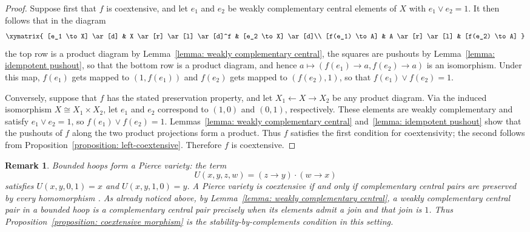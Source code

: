 \documentclass[11pt]{article}
\theoremstyle{pretty}
\theoremstyle{plainnote}
\newtheorem{remark}[theorem]{Remark}
\renewcommand{\2}{\mathbf{2}}
\begin{document}
\begin{proof}
Suppose first that $f$ is coextensive, and let $e_1$ and $e_2$ be weakly complementary central elements of $X$ with $e_1 \vee e_2 = 1$. It then follows that in the diagram
\[
\xymatrix{
[e_1 \to X] \ar[d] & X \ar[r] \ar[l] \ar[d]^f & [e_2 \to X] \ar[d]\\ 
[f(e_1) \to A] & A \ar[r] \ar[l] & [f(e_2) \to A]
}
\]
the top row is a product diagram by Lemma~\ref{lemma: weakly complementary central}, the squares are pushouts by Lemma~\ref{lemma: idempotent pushout}, so that the bottom row is a product diagram, and hence $a \mapsto (f(e_1) \to a, f(e_2) \to a)$ is an isomorphism. Under this map, $f(e_1)$ gets mapped to $(1, f(e_1))$ and $f(e_2)$ gets mapped to $(f(e_2), 1)$, so that $f(e_1) \vee f(e_2) = 1$. 

Conversely, suppose that $f$ has the stated preservation property, and let $X_1\leftarrow X\to X_2$ be any product diagram. Via the induced isomorphism $X\cong X_1\times X_2$, let $e_1$ and $e_2$ correspond to $(1,0)$ and $(0,1)$, respectively. These elements are weakly complementary and satisfy $e_1\vee e_2=1$, so $f(e_1)\vee f(e_2)=1$. Lemmas~\ref{lemma: weakly complementary central} and~\ref{lemma: idempotent pushout} show that the pushouts of $f$ along the two product projections form a product. Thus $f$ satisfies the first condition for coextensivity; the second follows from Proposition~\ref{proposition: left-coextensive}. Therefore $f$ is coextensive.
\end{proof} 

\begin{remark}\label{remark: Pierce}
Bounded hoops form a Pierce variety: the term
\[
U(x,y,z,w)=(z\to y)\cdot(w\to x)
\]
satisfies $U(x,y,0,1)=x$ and $U(x,y,1,0)=y$. A Pierce variety is coextensive if and only if complementary central pairs are preserved by every homomorphism \cite[Theorem~1]{Botero2021}. As already noticed above, by Lemma~\ref{lemma: weakly complementary central}, a weakly complementary central pair in a bounded hoop is a complementary central pair precisely when its elements admit a join and that join is $1$. Thus Proposition~\ref{proposition: coextensive morphism} is the stability-by-complements condition in this setting.
\end{remark}
\end{document}
